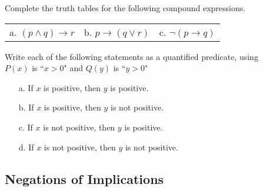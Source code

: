     \begin{questionNOGRADE}{\thequestion}
        Complete the truth tables for the following
        compound expressions.

        \begin{center}
            \begin{tabular}{p{4cm} p{4cm} p{4cm}}
                a. $(p \land q) \to r$ &
                b. $p \to (q \lor r)$ &
                c. $\neg( p \to q )$
            \end{tabular}
        \end{center}        
    \end{questionNOGRADE}

    \hrulefill

    \begin{questionNOGRADE}{\thequestion}
        Write each of the following statements as a
        quantified predicate, using \\
        $P(x)$ is ``$x > 0$" and
        $Q(y)$ is ``$y > 0$"

        \begin{enumerate}
            \item[a.] If $x$ is positive, then $y$ is positive. 
            \item[b.] If $x$ is positive, then $y$ is not positive. 
            \item[c.] If $x$ is not positive, then $y$ is positive. 
            \item[d.] If $x$ is not positive, then $y$ is not positive.
        \end{enumerate}        
    \end{questionNOGRADE}

    \newpage

    \subsection{Negations of Implications}

